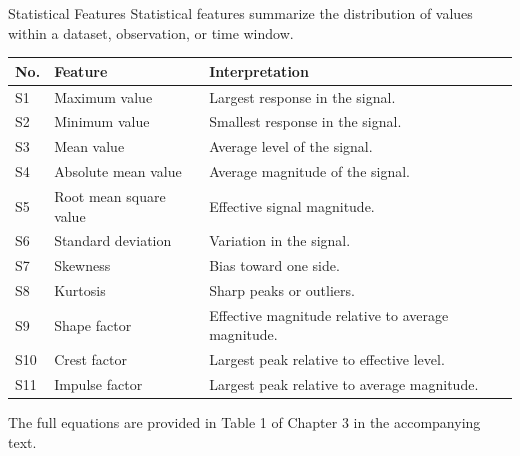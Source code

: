 \documentclass[aspectratio=169]{beamer}
\begin{document}
\begin{frame}{Statistical Features}
	Statistical features summarize the distribution of values within a dataset, observation, or time window.
	
	\vspace{0.4em}
	
	\begin{table}
		\centering
		\scriptsize
		\begin{tabular}{p{} p{} p{}}
			\hline
			\textbf{No.} & \textbf{Feature} & \textbf{Interpretation} \\
			\hline
			S1 & Maximum value & Largest response in the signal. \\
			S2 & Minimum value & Smallest response in the signal. \\
			S3 & Mean value & Average level of the signal. \\
			S4 & Absolute mean value & Average magnitude of the signal. \\
			S5 & Root mean square value & Effective signal magnitude. \\
			S6 & Standard deviation & Variation in the signal. \\
			S7 & Skewness & Bias toward one side. \\
			S8 & Kurtosis & Sharp peaks or outliers. \\
			S9 & Shape factor & Effective magnitude relative to average magnitude. \\
			S10 & Crest factor & Largest peak relative to effective level. \\
			S11 & Impulse factor & Largest peak relative to average magnitude. \\
			\hline
		\end{tabular}
	\end{table}
	
	\vspace{0.3em}
	
	{\scriptsize * The full equations are provided in Table 1 of Chapter 3 in the accompanying text.}
\end{frame}

\end{document}

